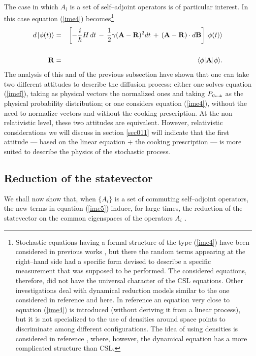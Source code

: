 \documentclass[10pt,a4paper]{article}
\begin{document}
The case in which $A_{i}$ is a set of self--adjoint operators is
of particular interest. In this case equation (\ref{ime4})
becomes\footnote{Stochastic equations having a formal structure of
the type (\ref{ime4}) have been considered in previous works
\cite{gis1,pea1}, but there the random terms appearing at the
right--hand side had a specific form devised to describe a
specific measurement that was supposed to be performed. The
considered equations, therefore, did not have the universal
character of the CSL equations. Other investigations
\cite{gisfl,di1,di2} deal with dynamical reduction models similar
to the one considered in reference \cite{csl0} and here. In
reference \cite{di1} an equation very close to equation
(\ref{ime4}) is introduced (without deriving it from a linear
process), but it is not specialized to the use of densities around
space points to discriminate among different configurations. The
idea of using densities is considered in reference \cite{di2},
where, however, the dynamical equation has a more complicated
structure than CSL.}
\begin{eqnarray} \label{ime5}
d\, |\phi(t)\rangle & = & \left[-\frac{i}{\hbar} H\, dt \, - \,
\frac{1}{2}\gamma ({\bf A} - {\bf R})^{2}  dt \, + \, ( {\bf A} -
{\bf R})\cdot d{\bf B}
\right] |\phi(t)\rangle \nonumber \\
& & \nonumber \\
{\bf R} & = &  \langle \phi|{\bf A}|\phi \rangle.
\end{eqnarray}
The analysis of this and of the previous subsection have shown
that one can take two different attitudes to describe the
diffusion process: either one solves equation (\ref{imef}), taking
as physical vectors the normalized ones and taking
$P_{\makebox{\tiny Cook}}$ as the physical probability
distribution; or one considers equation (\ref{ime4}), without the
need to normalize vectors and without the cooking prescription. At
the non relativistic level, these two attitudes are equivalent.
However, relativistic considerations we will discuss in section
\ref{sec011} will indicate that the first attitude
--- based on the linear equation + the cooking prescription --- is
more suited to describe the physics of the stochastic process.


\subsection{Reduction of the statevector} \label{sec63}

We shall now show that, when $\{A_{i}\}$ is a set of commuting
self--adjoint operators, the new terms in equation (\ref{ime5})
induce, for large times, the reduction of the statevector on the
common eigenspaces of the operators $A_{i}$ \cite{csl}.
\end{document}
